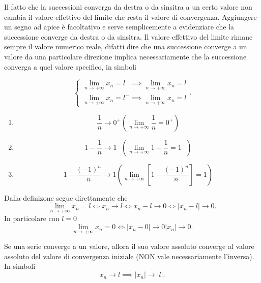 \begin{observation}
    Il fatto che la successioni converga da destra o da sinsitra a un certo valore
    non cambia il valore effettivo del limite che resta il valore di convergenza.
    Aggiungere un segno ad apice è facoltativo e serve semplicemente a evidenziare che
    la successione converge da destra o da sinsitra. Il valore effettivo del limite
    rimane sempre il valore numerico reale, difatti dire che una successione converge
    a un valore da una particolare direzione implica necessariamente che la successione
    converga a quel valore specifico, in simboli

    \[
        \begin{cases}
            \underset{n\rightarrow+\infty}{\lim} x_n = l^-\implies\underset{n\rightarrow+\infty}{\lim} x_n = l \\
            \underset{n\rightarrow+\infty}{\lim} x_n = l^+\implies\underset{n\rightarrow+\infty}{\lim} x_n = l
        \end{cases}.
    \]
\end{observation}

\begin{example}\leavevmode

    \begin{enumerate}[label=(\roman*)]
        \item \[
            \frac{1}{n} \rightarrow 0^+ \left(\underset{n\rightarrow+\infty}{\lim}\frac{1}{n}=0^+\right)
        \]
        \item \[
            1-\frac{1}{n} \rightarrow 1^-\left(\underset{n\rightarrow+\infty}{\lim}1-\frac{1}{n}=1^-\right)
        \]
        \item \[
            1-\frac{\left(-1\right)^n}{n} \rightarrow 1
            \left(\underset{n\rightarrow+\infty}{\lim}\left[1-\frac{\left(-1\right)^n}{n}\right]=
            1\right)
        \]
    \end{enumerate}
\end{example}

\begin{observation}
    Dalla definizone segue direttamente che
    \[
        \underset{n\rightarrow+\infty}{\lim} x_n = l \Leftrightarrow
        x_n \rightarrow l \Leftrightarrow
        x_n-l \rightarrow 0 \Leftrightarrow
        \left|x_n-l\right| \rightarrow 0.
    \]
    In particolare con $l=0$
    \[
        \underset{n\rightarrow+\infty}{\lim} x_n = 0 \Leftrightarrow
        \left|x_n - 0\right| \rightarrow 0
        \left|x_n\right| \rightarrow 0.
    \]
\end{observation}

\begin{corollary}\label{cor:con-val-ass}
    Se una serie converge a un valore, allora il suo valore assoluto converge al valore
    assoluto del valore di convergenza iniziale (NON vale necessariamente l'inversa).
    In simboli
    \[
        x_n\rightarrow l\implies \left|x_n\right|\rightarrow\left|l\right|.
    \]
\end{corollary}

